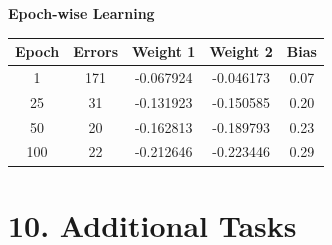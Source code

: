 \documentclass[11pt]{article}
\begin{document}
\vspace{3mm}

\textbf{Epoch-wise Learning}


\begin{tabular}{|c|c|c|c|c|}
\hline
\textbf{Epoch} & \textbf{Errors} & \textbf{Weight 1} & \textbf{Weight 2} & \textbf{Bias} \\
\hline
1   & 171 & -0.067924 & -0.046173 & 0.07 \\
25  & 31  & -0.131923 & -0.150585 & 0.20 \\
50  & 20  & -0.162813 & -0.189793 & 0.23 \\
100 & 22  & -0.212646 & -0.223446 & 0.29 \\
\hline
\end{tabular}

\section*{10. Additional Tasks}
\end{document}
